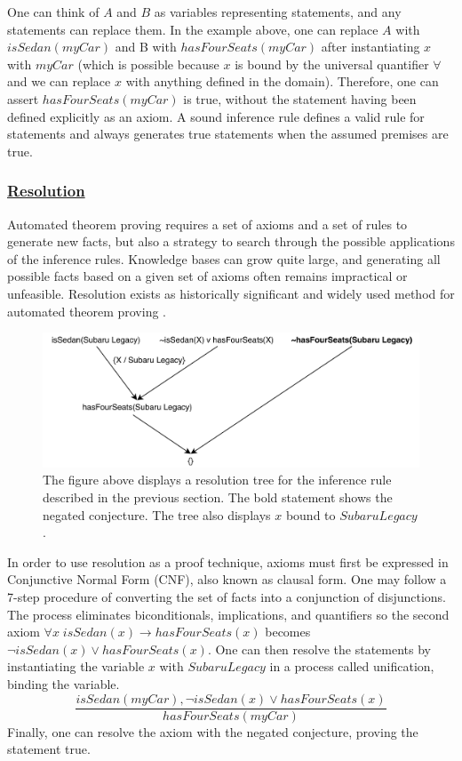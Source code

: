 \documentclass{article}
\begin{document}
One can think of $A$ and $B$ as variables representing statements, and any statements can replace them. In the example above, one can replace $A$ with $isSedan(myCar)$ and B with $hasFourSeats(myCar)$ after instantiating $x$ with $myCar$ (which is possible because $x$ is bound by the universal quantifier $\forall$ and we can replace $x$ with anything defined in the domain). Therefore, one can assert $hasFourSeats(myCar)$ is true, without the statement having been defined explicitly as an axiom. A sound inference rule defines a valid rule for statements and always generates true statements when the assumed premises are true. 
\subsubsection{\underline{Resolution}}

Automated theorem proving requires a set of axioms and a set of rules to generate new facts, but also a strategy to search through the possible applications of the inference rules. Knowledge bases can grow quite large, and generating all possible facts based on a given set of axioms often remains impractical or unfeasible. Resolution exists as historically significant and widely used method for automated theorem proving \cite[51]{ertel2018introduction}. 

\begin{figure}[h]
\centering
\includegraphics[width=6in]{resolution_tree}
\caption[Resolution Tree]{The figure above displays a resolution tree for the inference rule described in the previous section. The bold statement shows the negated conjecture. The tree also displays $x$ bound to $SubaruLegacy$.}
\label{fig:resolution_tree}
\end{figure}

In order to use resolution as a proof technique, axioms must first be expressed in Conjunctive Normal Form (CNF), also known as clausal form. One may follow a 7-step procedure of converting the set of facts into a conjunction of disjunctions. The process eliminates biconditionals, implications, and quantifiers so the second axiom $\forall x \; isSedan(x) \rightarrow hasFourSeats(x)$ becomes 
$\lnot isSedan(x) \lor hasFourSeats(x)$. One can then resolve the statements by instantiating the variable $x$ with $SubaruLegacy$ in a process called unification, binding the variable. 
\[\frac{isSedan(myCar), \lnot isSedan(x) \lor hasFourSeats(x)}{hasFourSeats(myCar)}\]
Finally, one can resolve the axiom with the negated conjecture, proving the statement true. 
\end{document}
